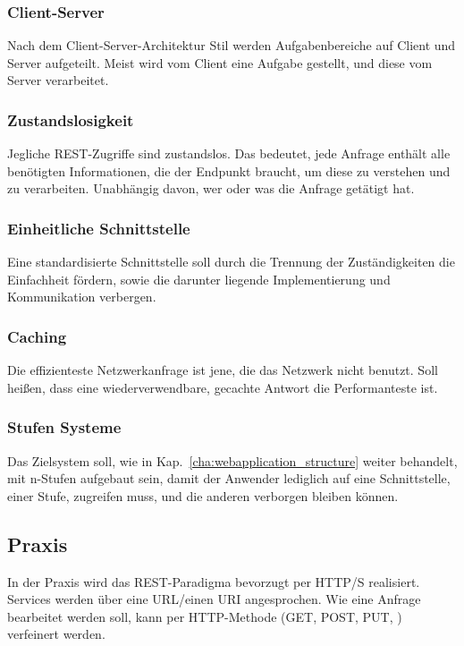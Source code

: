 \subsubsection{Client-Server}
Nach dem Client-Server-Architektur Stil werden Aufgabenbereiche auf Client und Server aufgeteilt. Meist wird vom Client eine Aufgabe gestellt, und diese vom Server verarbeitet. 
\subsubsection{Zustandslosigkeit}
Jegliche REST-Zugriffe sind zustandslos. Das bedeutet, jede Anfrage enthält alle benötigten Informationen, die der Endpunkt braucht, um diese zu verstehen und zu verarbeiten. Unabhängig davon, wer oder was die Anfrage getätigt hat.  
\subsubsection{Einheitliche Schnittstelle}
Eine standardisierte Schnittstelle soll durch die Trennung der Zuständigkeiten die Einfachheit fördern, sowie die darunter liegende Implementierung und Kommunikation verbergen. 
\subsubsection{Caching}
Die effizienteste Netzwerkanfrage ist jene, die das Netzwerk nicht benutzt.
Soll heißen, dass eine wiederverwendbare, gecachte Antwort die Performanteste ist. 
\subsubsection{Stufen Systeme}
Das Zielsystem soll, wie in Kap.~\ref{cha:webapplication_structure} weiter behandelt, mit n-Stufen aufgebaut sein, damit der Anwender lediglich auf eine Schnittstelle, einer Stufe, zugreifen muss, und die anderen verborgen bleiben können.

\subsection{Praxis}
In der Praxis wird das REST-Paradigma bevorzugt per HTTP/S realisiert. Services werden über eine URL/einen URI angesprochen. Wie eine Anfrage bearbeitet werden soll, kann per HTTP-Methode (GET, POST, PUT, \etc) verfeinert werden. 